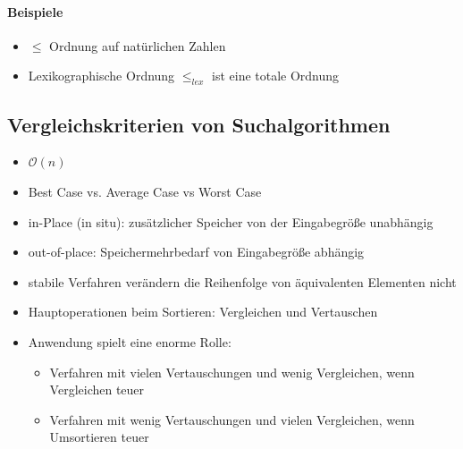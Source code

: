 \documentclass[
    ngerman,
    color=3b,
    dark_mode,
    load_common, %
    summary,
    boxarc,
]{rubos-tuda-template}
\begin{document}
\paragraph{Beispiele}\mbox{}
\begin{grayInfoBox}
    \begin{itemize}
        \item $\leq$ Ordnung auf natürlichen Zahlen
        \item Lexikographische Ordnung $\leq_{lex}$ ist eine totale Ordnung
    \end{itemize}
\end{grayInfoBox}
\subsection{Vergleichskriterien von Suchalgorithmen}\label{Vergleichskriterien von Suchalgorithmen}
\begin{description}[leftmargin=3.6cm,itemsep=1em]
    \item[Berechnungsaufwand] \begin{itemize}
            \item $\mathcal{O}(n)$
        \end{itemize}
    \item[Effizienz] \begin{itemize}
            \item Best Case vs. Average Case vs Worst Case
        \end{itemize}
    \item[Speicherbedarf] \begin{itemize}
            \item in-Place (in situ): zusätzlicher Speicher von der Eingabegrö\ss{}e unabhängig
            \item out-of-place: Speichermehrbedarf von Eingabegrö\ss{}e abhängig
        \end{itemize}
    \item[Stabilität] \begin{itemize}
            \item stabile Verfahren verändern die Reihenfolge von äquivalenten Elementen nicht
        \end{itemize}
    \item[Anwendung als Auswahlfaktor] \begin{itemize}
            \item Hauptoperationen beim Sortieren: Vergleichen und Vertauschen
            \item Anwendung spielt eine enorme Rolle:\begin{itemize}
                      \item Verfahren mit vielen Vertauschungen und wenig Vergleichen, wenn Vergleichen teuer
                      \item Verfahren mit wenig Vertauschungen und vielen Vergleichen, wenn Umsortieren teuer
                  \end{itemize}
        \end{itemize}
\end{description}
\clearpage
\end{document}
